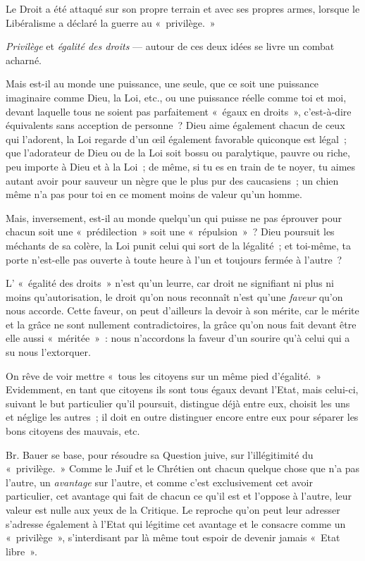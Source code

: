 \documentclass[french,twoside]{book} %
\begin{document}
\noindent Le Droit a été attaqué sur son propre terrain et avec ses propres armes, lorsque le Libéralisme a déclaré la guerre au « privilège. »\par
\emph{Privilège} et \emph{égalité des droits} — autour de ces deux idées se livre un combat acharné.\par
Mais est-il au monde une puissance, une seule, que ce soit une puissance imaginaire comme Dieu, la Loi, etc., ou une puissance réelle comme toi et moi, devant laquelle tous ne soient pas parfaitement « égaux en droits », c’est-à-dire équivalents sans acception de personne ? Dieu aime également chacun de ceux qui l’adorent, la Loi regarde d’un œil également favorable quiconque est légal ; que l’adorateur de Dieu ou de la Loi soit bossu ou paralytique, pauvre ou riche, peu importe à Dieu et à la Loi ; de même, si tu es en train de te noyer, tu aimes autant avoir pour sauveur un nègre que le plus pur des caucasiens ; un chien même n’a pas pour toi en ce moment moins de valeur qu’un homme.\par
Mais, inversement, est-il au monde quelqu’un qui puisse ne pas éprouver pour chacun soit une « prédilection » soit une « répulsion » ? Dieu poursuit les méchants de sa colère, la Loi punit celui qui sort de  la légalité ; et toi-même, ta porte n’est-elle pas ouverte à toute heure à l’un et toujours fermée à l’autre ?\par
L’ « égalité des droits » n’est qu’un leurre, car droit ne signifiant ni plus ni moins qu’autorisation, le droit qu’on nous reconnaît n’est qu’une \emph{faveur }qu’on nous accorde. Cette faveur, on peut d’ailleurs la devoir à son mérite, car le mérite et la grâce ne sont nullement contradictoires, la grâce qu’on nous fait devant être elle aussi « méritée » : nous n’accordons la faveur d’un sourire qu’à celui qui a su nous l’extorquer.\par
On rêve de voir mettre « tous les citoyens sur un même pied d’égalité. » Evidemment, en tant que citoyens ils sont tous égaux devant l’Etat, mais celui-ci, suivant le but particulier qu’il poursuit, distingue déjà entre eux, choisit les uns et néglige les autres ; il doit en outre distinguer encore entre eux pour séparer les bons citoyens des mauvais, etc.\par
Br. Bauer se base, pour résoudre sa Question juive, sur l’illégitimité du « privilège. » Comme le Juif et le Chrétien ont chacun quelque chose que n’a pas l’autre, un \emph{avantage} sur l’autre, et comme c’est exclusivement cet avoir particulier, cet avantage qui fait de chacun ce qu’il est et l’oppose à l’autre, leur valeur est nulle aux yeux de la Critique. Le reproche qu’on peut leur adresser s’adresse également à l’Etat qui légitime cet avantage et le consacre comme un « privilège », s’interdisant par là même tout espoir de devenir jamais « Etat libre ».\par
\end{document}
